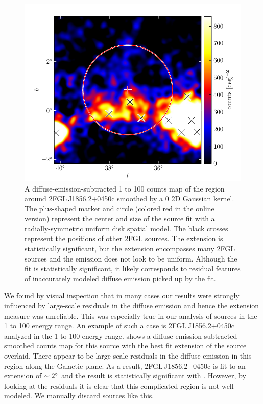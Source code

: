 \begin{figure}[htbp]
    \includegraphics{chapters/extended_search/figures/source_plots/example_bad_fit_color.pdf}
    \caption{A diffuse-emission-subtracted 1 \gev to 100 \gev counts
    map of the region around 2FGL\,J1856.2+0450c smoothed by a 0
    2D Gaussian kernel. The plus-shaped marker and circle (colored
    red in the online version) represent the center and size of the
    source fit with a radially-symmetric uniform disk spatial model.
    The black crosses represent the positions of other 2FGL sources.
    The extension is statistically significant, but the extension
    encompasses many 2FGL sources and the emission does not look to be
    uniform. Although the fit is statistically significant, it likely
    corresponds to residual features of inaccurately modeled diffuse
    emission picked up by the fit.}
\end{figure}

We found by visual inspection that in many cases our results were strongly
influenced by large-scale residuals in the diffuse emission and hence
the extension measure was unreliable.  This was especially true in our
analysis of sources in the 1 \gev to 100 \gev energy range.  An example
of such a case is 2FGL\,J1856.2+0450c analyzed in the 1 \gev to 100 \gev
energy range.  shows a diffuse-emission-subtracted
smoothed counts map for this source with the best fit extension of
the source overlaid. There appear to be large-scale residuals in
the diffuse emission in this region along the Galactic plane.  As a
result, 2FGL\,J1856.2+0450c is fit to an extension of $\sim2^\circ$
and the result is statistically significant with . However,
by looking at the residuals it is clear that this complicated region is
not well modeled. We manually discard sources like this.


